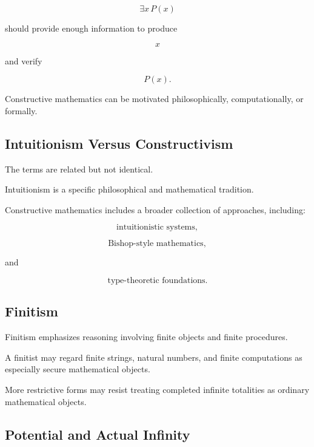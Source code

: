 \[
\exists x\,P(x)
\]

should provide enough information to produce

\[
\boxed{
x
}
\]

and verify

\[
\boxed{
P(x).
}
\]

Constructive mathematics can be motivated philosophically,
computationally, or formally.

\subsection{Intuitionism Versus Constructivism}
\label{subsec:intuitionism-versus-constructivism}

The terms are related but not identical.

Intuitionism is a specific philosophical and mathematical tradition.

Constructive mathematics includes a broader collection of approaches,
including:

\[
\boxed{
\text{intuitionistic systems},
}
\]

\[
\boxed{
\text{Bishop-style mathematics},
}
\]

and

\[
\boxed{
\text{type-theoretic foundations}.
}
\]

\subsection{Finitism}
\label{subsec:mathematical-finitism}

Finitism emphasizes reasoning involving finite objects and finite
procedures.

A finitist may regard finite strings, natural numbers, and finite
computations as especially secure mathematical objects.

More restrictive forms may resist treating completed infinite totalities as
ordinary mathematical objects.

\subsection{Potential and Actual Infinity}
\label{subsec:potential-actual-infinity}

